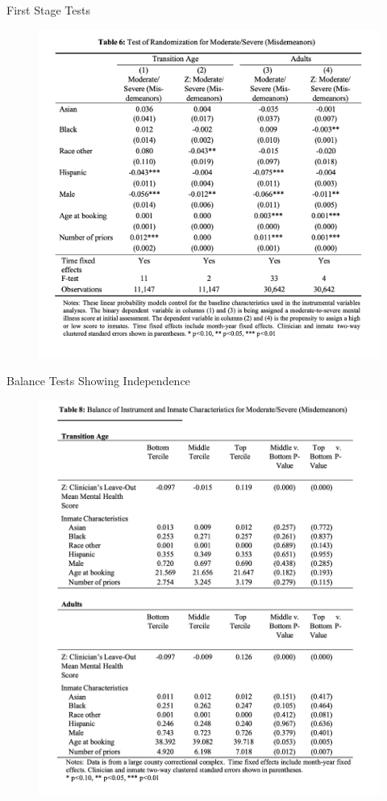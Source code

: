 \documentclass{beamer}
\begin{document}
\begin{frame}{First Stage Tests}
	\begin{figure}
             \centering
             \includegraphics[scale=0.3]{./lecture_includes/jhr_ivfig3}
	\end{figure}
\end{frame}

\begin{frame}{Balance Tests Showing Independence}
	\begin{figure}
             \centering
             \includegraphics[scale=0.2]{./lecture_includes/jhr_ivfig4}
	\end{figure}
\end{frame}
\end{document}
